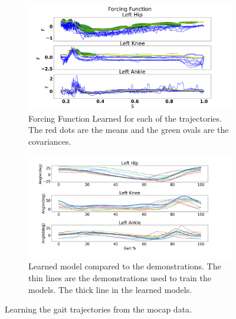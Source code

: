 \begin{figure}[!h]
    \begin{subfigure}{\textwidth}
        \centering
        \includegraphics[scale=0.35]{images/gait_data/force_function2.png}
        \caption[Gait Forcing Function]{Forcing Function Learned for each of the trajectories. The red dots are the means and the green ovals are the covariances.}
        \label{fig:force}  
    \end{subfigure}

    \begin{subfigure}{\textwidth}
       \centering
    \includegraphics[scale=0.35]{images/gait_data/learnedModel.png}
    \caption[Learned Gait Model]{Learned model compared to the demonstrations. The thin lines are the demonstrations used to train the models. The thick line in the learned models.}
    \label{fig:learnedModel}
    \end{subfigure}
    \caption{Learning the gait trajectories from the mocap data.}
    \label{fig:learninggaittrajectories}
\end{figure}






